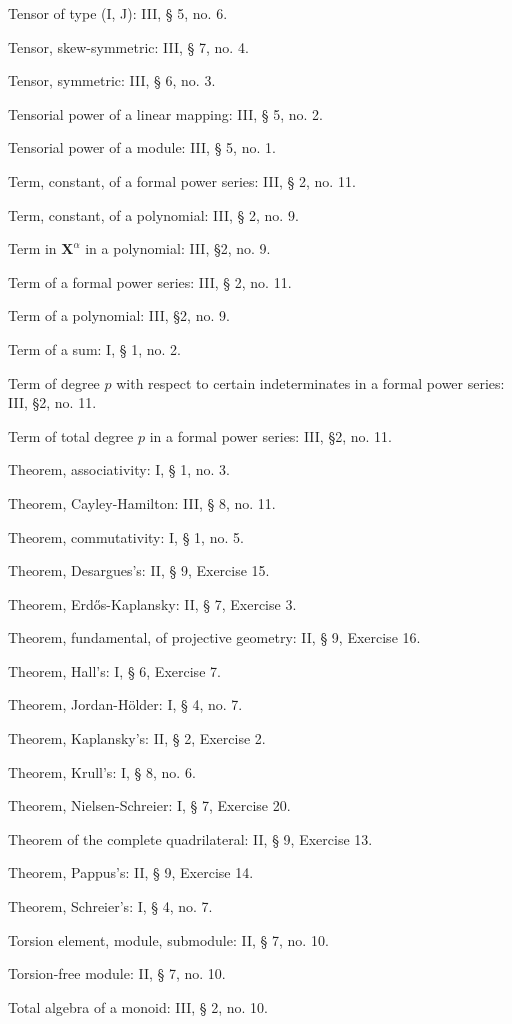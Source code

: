 Tensor of type (I, J): III, § 5, no. 6.

Tensor, skew-symmetric: III, § 7, no. 4.

Tensor, symmetric: III, § 6, no. 3.

Tensorial power of a linear mapping: III, § 5, no. 2.

Tensorial power of a module: III, § 5, no. 1.

Term, constant, of a formal power series: III, § 2, no. 11.

Term, constant, of a polynomial: III, § 2, no. 9.

Term in \(\mathbf{X}^{\alpha}\) in a polynomial: III, §2, no. 9.

Term of a formal power series: III, § 2, no. 11.

Term of a polynomial: III, §2, no. 9.

Term of a sum: I, § 1, no. 2.

Term of degree \(p\) with respect to certain indeterminates in a formal power series: III, §2, no. 11.

Term of total degree \(p\) in a formal power series: III, §2, no. 11.

Theorem, associativity: I, § 1, no. 3.

Theorem, Cayley-Hamilton: III, § 8, no. 11.

Theorem, commutativity: I, § 1, no. 5.

Theorem, Desargues's: II, § 9, Exercise 15.

Theorem, Erdős-Kaplansky: II, § 7, Exercise 3.

Theorem, fundamental, of projective geometry: II, § 9, Exercise 16.

Theorem, Hall's: I, § 6, Exercise 7.

Theorem, Jordan-Hölder: I, § 4, no. 7.

Theorem, Kaplansky's: II, § 2, Exercise 2.

Theorem, Krull's: I, § 8, no. 6.

Theorem, Nielsen-Schreier: I, § 7, Exercise 20.

Theorem of the complete quadrilateral: II, § 9, Exercise 13.

Theorem, Pappus's: II, § 9, Exercise 14.

Theorem, Schreier's: I, § 4, no. 7.

Torsion element, module, submodule: II, § 7, no. 10.

Torsion-free module: II, § 7, no. 10.

Total algebra of a monoid: III, § 2, no. 10.

